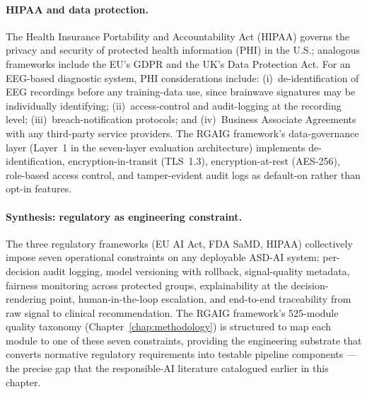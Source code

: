 \paragraph{HIPAA and data protection.}
The Health Insurance Portability and Accountability Act (HIPAA) governs the privacy and security of protected health information (PHI) in the U.S.; analogous frameworks include the EU's GDPR and the UK's Data Protection Act. For an EEG-based diagnostic system, PHI considerations include: (i)~de-identification of EEG recordings before any training-data use, since brainwave signatures may be individually identifying; (ii)~access-control and audit-logging at the recording level; (iii)~breach-notification protocols; and (iv)~Business Associate Agreements with any third-party service providers. The RGAIG framework's data-governance layer (Layer~1 in the seven-layer evaluation architecture) implements de-identification, encryption-in-transit (TLS~1.3), encryption-at-rest (AES-256), role-based access control, and tamper-evident audit logs as default-on rather than opt-in features.

\paragraph{Synthesis: regulatory as engineering constraint.}
The three regulatory frameworks (EU AI Act, FDA SaMD, HIPAA) collectively impose seven operational constraints on any deployable ASD-AI system: per-decision audit logging, model versioning with rollback, signal-quality metadata, fairness monitoring across protected groups, explainability at the decision-rendering point, human-in-the-loop escalation, and end-to-end traceability from raw signal to clinical recommendation. The RGAIG framework's 525-module quality taxonomy (Chapter~\ref{chap:methodology}) is structured to map each module to one of these seven constraints, providing the engineering substrate that converts normative regulatory requirements into testable pipeline components --- the precise gap that the responsible-AI literature catalogued earlier in this chapter.

